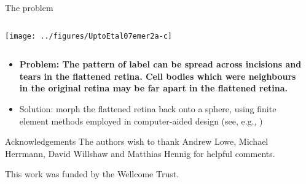 \documentclass[final,hyperref={pdfpagelabels=false}]{beamer}
\newcommand{\figack}[1]{{\par\small\vskip -0.5ex\hfill{\color{blue} #1}\par}}
\begin{document}
\begin{frame}{}
\begin{columns}[T]
\begin{column}{.33\linewidth}
\begin{block}{The problem}
\begin{columns}
\begin{column}{0.25\linewidth}
            \texttt{[image: ../figures/UptoEtal07emer2a-c]}
          \end{column}
        \end{columns}


        \begin{itemize}
        \item \textbf{Problem: The pattern of label can be spread
            across incisions and tears in the flattened retina. Cell
            bodies which were neighbours in the original retina may be
            far apart in the flattened retina.}
        \item Solution: morph the flattened retina back onto a sphere,
          using finite element methods employed in computer-aided
          design (see, e.g., \citealp{MaCaEtal99flat})
        \end{itemize}
      \end{block}

      \begin{block}{\large Acknowledgements}
        \small The authors wish to thank Andrew Lowe, Michael
        Herrmann, David Willshaw and Matthias Hennig for helpful
        comments.

        This work was funded by the Wellcome Trust.
      \end{block}




    \end{column}

    \begin{column}{.33\linewidth}


\end{column}
\end{columns}
\end{frame}
\end{document}
